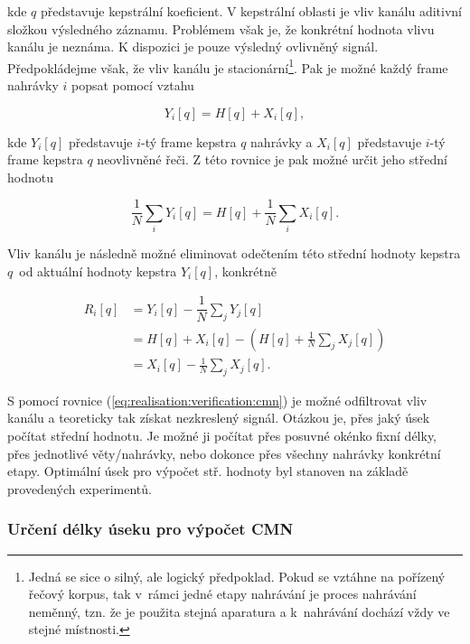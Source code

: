 \noindent kde $q$ představuje kepstrální koeficient.
V kepstrální oblasti je vliv kanálu aditivní složkou výsledného záznamu.
Problémem však je, že konkrétní hodnota vlivu kanálu je neznáma.
K dispozici je pouze výsledný ovlivněný signál.
Předpokládejme však, že vliv kanálu je stacionární\footnote{Jedná se sice o silný, ale logický předpoklad. Pokud se vztáhne na pořízený řečový korpus, tak v~rámci jedné etapy nahrávání je proces nahrávání neměnný, tzn. že je použita stejná aparatura a  k~nahrávání dochází vždy ve stejné místnosti.}.
Pak je možné každý frame nahrávky $i$ popsat pomocí vztahu

\begin{equation}
  Y_i\left[q\right] = H\left[q\right] + X_i\left[q\right],
\end{equation}

\noindent kde $Y_i\left[q\right]$ představuje $i$-tý frame kepstra $q$ nahrávky a $X_i\left[q\right]$ představuje $i$-tý frame kepstra $q$ neovlivněné řeči.
Z této rovnice je pak možné určit jeho střední hodnotu

\begin{equation}
  \frac{1}{N} \sum_i Y_i\left[q\right] = H\left[q\right] + \frac{1}{N} \sum_i X_i\left[q\right].
\end{equation}

\noindent Vliv kanálu je následně možné eliminovat odečtením této střední hodnoty kepstra $q$~od aktuální hodnoty kepstra $Y_i\left[q\right]$, konkrétně

\begin{align}
  R_i\left[q\right] &= Y_i\left[q\right] - \dfrac{1}{N}\sum_{j} Y_j\left[q\right] \nonumber  \\
  &= H\left[q\right] + X_i\left[q\right] - \left( H\left[q\right] + \frac{1}{N} \sum_j X_j\left[q\right] \right) \nonumber  \\
  &= X_i\left[q\right] - \frac{1}{N} \sum_j X_j\left[q\right].
  \label{eq:realisation:verification:cmn}
\end{align}

\noindent S pomocí rovnice (\ref{eq:realisation:verification:cmn}) je možné odfiltrovat vliv kanálu a teoreticky tak získat nezkreslený signál.
Otázkou je, přes jaký úsek počítat střední hodnotu.
Je možné ji počítat přes posuvné okénko fixní délky, přes jednotlivé věty/nahrávky, nebo dokonce přes všechny nahrávky konkrétní etapy.
Optimální úsek pro výpočet stř. hodnoty byl stanoven na základě provedených experimentů.

\subsubsection{Určení délky úseku pro výpočet CMN}

